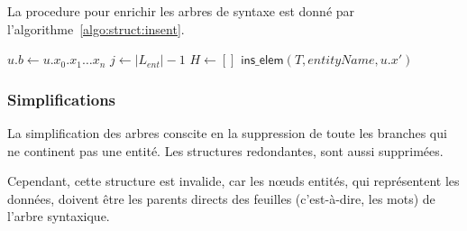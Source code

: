 La procedure pour enrichir les arbres de syntaxe est donné par l'algorithme~\ref{algo:struct:insent}.

\begin{algorithm}[H]
    \caption{$\textsf{ins\_ent}(T = (D, t), TreeEnt)$}
        \label{algo:struct:insent}

    $u.b \gets u.x_0.x_1 \dots x_n$\;
         
    $j \gets |L_{ent}| - 1$\;
    $H \gets []$\;
    $\textsf{ins\_elem}(T, entityName, u.x')$\;
\end{algorithm}

\subsubsection{Simplifications}

La simplification des arbres conscite en la suppression de toute les branches qui ne continent pas une entité.
Les structures redondantes, sont aussi supprimées.


Cependant, cette structure est invalide, car les nœuds entités, qui représentent les données, doivent être les parents directs des feuilles (c'est-à-dire, les mots) de l'arbre syntaxique.

